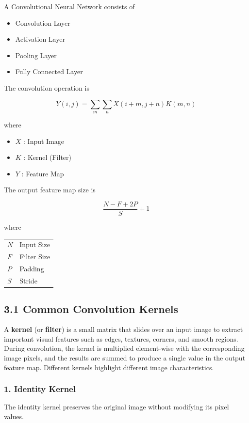 \documentclass[11pt]{article}
\begin{document}
A Convolutional Neural Network consists of

\begin{itemize}
\item Convolution Layer
\item Activation Layer
\item Pooling Layer
\item Fully Connected Layer
\end{itemize}

The convolution operation is

\[
Y(i,j)=\sum_m\sum_n X(i+m,j+n)K(m,n)
\]

where

\begin{itemize}
\item $X$ : Input Image
\item $K$ : Kernel (Filter)
\item $Y$ : Feature Map
\end{itemize}

The output feature map size is

\[
\frac{N-F+2P}{S}+1
\]

where

\begin{tabular}{ll}
$N$ & Input Size\\
$F$ & Filter Size\\
$P$ & Padding\\
$S$ & Stride
\end{tabular}

\subsection*{3.1 Common Convolution Kernels}

A \textbf{kernel} (or \textbf{filter}) is a small matrix that slides over an input image to extract important visual features such as edges, textures, corners, and smooth regions. During convolution, the kernel is multiplied element-wise with the corresponding image pixels, and the results are summed to produce a single value in the output feature map. Different kernels highlight different image characteristics.

\subsubsection*{1. Identity Kernel}

The identity kernel preserves the original image without modifying its pixel values.
\end{document}
